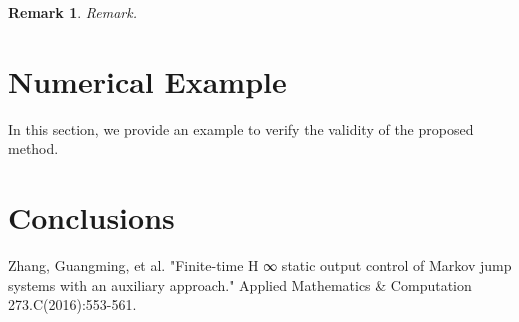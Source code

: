 \documentclass[conference]{IEEEtran}
\newtheorem{remark}{Remark}
\begin{document}
\begin{remark}
	Remark.
\end{remark}

\section{Numerical Example} \label{example}
In this section, we provide an example to verify the validity of the proposed method. 





\section{Conclusions} \label{conclusion}




%
%


\begin{thebibliography}{1}
	
	Zhang, Guangming, et al. "Finite-time H ∞ static output control of Markov jump systems with an auxiliary approach." Applied Mathematics \& Computation 273.C(2016):553-561.
	
\end{thebibliography}




\end{document}
